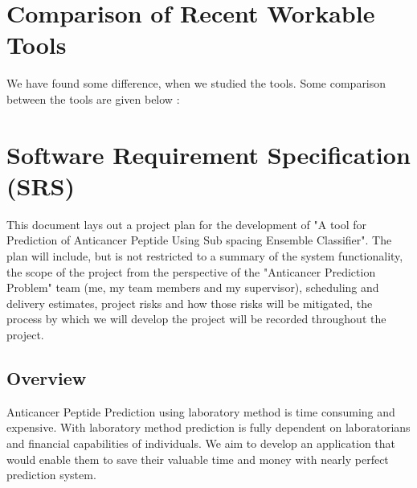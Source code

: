 \section{Comparison of Recent Workable Tools}
We have found some difference, when we studied the tools. Some comparison between the tools are given below :
\begin{table}[htbp]
\caption[Comparison of Recent Workable Tools]{Sprint-Mal \& ACPred-FL }
\centering
\footnotesize
{}
\end{table}

\section{Software Requirement Specification (SRS)}
This document lays out a project plan for the development of "A tool for Prediction of Anticancer Peptide Using Sub spacing Ensemble Classifier". The plan will include, but is not restricted to a summary of the system functionality, the scope of the project from the perspective of the "Anticancer Prediction Problem" team (me, my team members and my supervisor), scheduling and delivery estimates, project risks and how those risks will be mitigated, the process by which we will develop the project will be recorded throughout the project.
\subsection{Overview}
Anticancer Peptide Prediction using laboratory method is time consuming and expensive. With laboratory method prediction is fully dependent on laboratorians and financial capabilities of individuals. We aim to develop an application that would enable them to save their valuable time and money with nearly perfect prediction system.
